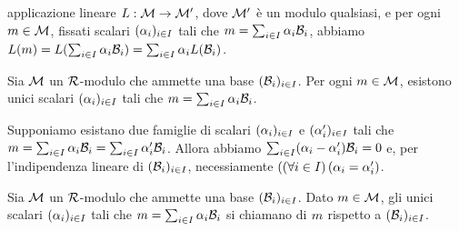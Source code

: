 applicazione lineare $L: \mathcal{M} \rightarrow \mathcal{M}'$, dove
$\mathcal{M}'$ \`e un modulo qualsiasi, e per ogni
$m \in \mathcal{M}$, fissati scalari $(\alpha_i)_{i \in I}$ tali
che $m = \sum_{i \in I} \alpha_i\mathcal{B}_i$, abbiamo
$L(m) =
L(\sum_{i \in I} \alpha_i\mathcal{B}_i) =
\sum_{i \in I} \alpha_i L(\mathcal{B}_i)$. \EndProof
\begin{Theorem}
	Sia $\mathcal{M}$ un $\mathcal{R}$-modulo che ammette una base
	$(\mathcal{B}_i)_{i \in I}$. Per ogni $m \in
	\mathcal{M}$, esistono unici scalari $(\alpha_i)_{i \in I}$ tali che
	$m = \sum_{i \in I} \alpha_i \mathcal{B}_i$.
\end{Theorem}
\Proof Supponiamo esistano due famiglie di scalari $(\alpha_i)_{i \in I}$
e $(\alpha'_i)_{i \in I}$ tali che $m =
\sum_{i \in I} \alpha_i \mathcal{B}_i =
\sum_{i \in I} \alpha'_i \mathcal{B}_i$. Allora abbiamo
$\sum_{i \in I} (\alpha_i - \alpha'_i) \mathcal{B}_i = 0$ e, per
l'indipendenza lineare di $(\mathcal{B}_i)_{i \in I}$, necessiamente
$(\left ( \forall i \in I \right ) \left ( \alpha_i = \alpha'_i \right )$. \EndProof
\begin{Definition}
	Sia $\mathcal{M}$ un $\mathcal{R}$-modulo che ammette una base
	$(\mathcal{B}_i)_{i \in I}$. Dato $m \in \mathcal{M}$,
	gli unici scalari $(\alpha_i)_{i \in I}$ tali che
	$m = \sum_{i \in I} \alpha_i \mathcal{B}_i$ si
	chiamano  di $m$ rispetto a
	$(\mathcal{B}_i)_{i \in I}$.
\end{Definition}
